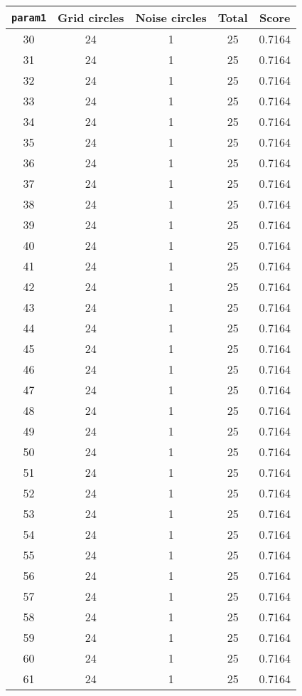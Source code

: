 \documentclass[letterpaper, 12pt]{article}
\begin{document}
\begin{longtable}{|c|c|c|c|c|}
\hline
\textbf{\texttt{param1}} & \textbf{Grid circles} & \textbf{Noise circles} & \textbf{Total} & \textbf{Score} \\
\hline
30 & 24 & 1 & 25 & 0.7164 \\
\hline
31 & 24 & 1 & 25 & 0.7164 \\
\hline
32 & 24 & 1 & 25 & 0.7164 \\
\hline
33 & 24 & 1 & 25 & 0.7164 \\
\hline
34 & 24 & 1 & 25 & 0.7164 \\
\hline
35 & 24 & 1 & 25 & 0.7164 \\
\hline
36 & 24 & 1 & 25 & 0.7164 \\
\hline
37 & 24 & 1 & 25 & 0.7164 \\
\hline
38 & 24 & 1 & 25 & 0.7164 \\
\hline
39 & 24 & 1 & 25 & 0.7164 \\
\hline
40 & 24 & 1 & 25 & 0.7164 \\
\hline
41 & 24 & 1 & 25 & 0.7164 \\
\hline
42 & 24 & 1 & 25 & 0.7164 \\
\hline
43 & 24 & 1 & 25 & 0.7164 \\
\hline
44 & 24 & 1 & 25 & 0.7164 \\
\hline
45 & 24 & 1 & 25 & 0.7164 \\
\hline
46 & 24 & 1 & 25 & 0.7164 \\
\hline
47 & 24 & 1 & 25 & 0.7164 \\
\hline
48 & 24 & 1 & 25 & 0.7164 \\
\hline
49 & 24 & 1 & 25 & 0.7164 \\
\hline
50 & 24 & 1 & 25 & 0.7164 \\
\hline
51 & 24 & 1 & 25 & 0.7164 \\
\hline
52 & 24 & 1 & 25 & 0.7164 \\
\hline
53 & 24 & 1 & 25 & 0.7164 \\
\hline
54 & 24 & 1 & 25 & 0.7164 \\
\hline
55 & 24 & 1 & 25 & 0.7164 \\
\hline
56 & 24 & 1 & 25 & 0.7164 \\
\hline
57 & 24 & 1 & 25 & 0.7164 \\
\hline
58 & 24 & 1 & 25 & 0.7164 \\
\hline
59 & 24 & 1 & 25 & 0.7164 \\
\hline
60 & 24 & 1 & 25 & 0.7164 \\
\hline
61 & 24 & 1 & 25 & 0.7164 \\

\end{longtable}
\end{document}
